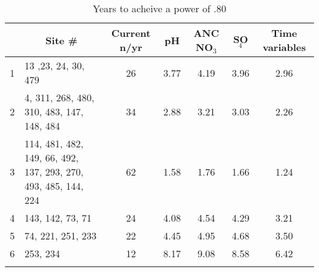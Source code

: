 \begin{table}[htbp]
\caption{Years to acheive a power of .80}
\begin{tabular}{clccccc}
\hline\noalign{\smallskip}
\multicolumn{1}{p{2cm}}{Elevation Bands} & \multicolumn{1}{c}{Site \#} & \multicolumn{1}{p{2cm}}{Current n/yr} & pH &\multicolumn{1}{p{1cm}}{ ANC NO$_3$} & SO$_4$ & \multicolumn{1}{p{3cm}}{Time variables} \\  
\hline\noalign{\smallskip}
1 & 13 ,23, 24, 30, 479 & 26 & 3.77  & 4.19  & 3.96  & 2.96  \\ 
2 & \multicolumn{1}{p{4cm}}{4, 311, 268, 480, 310, 483, 147, 148, 484} & 34 & 2.88  & 3.21  & 3.03  & 2.26  \\ 
3 & \multicolumn{ 1}{p{4cm}}{114, 481, 482, 149, 66, 492, 137, 293, 270, 493, 485, 144, 224} & \multicolumn{ 1}{c}{62} & \multicolumn{ 1}{c}{1.58 } & \multicolumn{ 1}{c}{1.76 } & \multicolumn{ 1}{c}{1.66 } & \multicolumn{ 1}{c}{1.24} \\ 
4 & 143, 142, 73, 71 & 24 & 4.08  & 4.54  & 4.29  & 3.21  \\ 
5 & 74, 221, 251, 233 & 22 & 4.45  & 4.95  & 4.68  & 3.50  \\ 
6 & 253, 234 & 12 & 8.17  & 9.08  & 8.58  & 6.42  \\  \hline\noalign{\smallskip}
\end{tabular}
\label{currentyrsto.80}
\end{table}